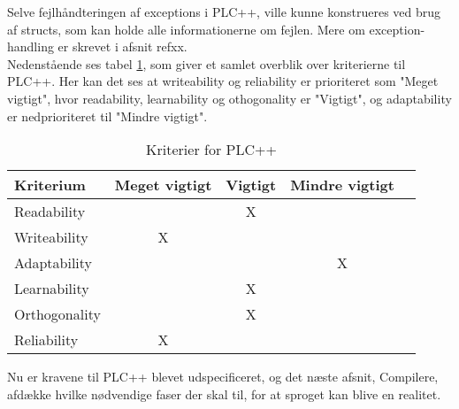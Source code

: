 Selve fejlhåndteringen af exceptions i PLC++, ville kunne konstrueres ved brug af structs, som kan holde alle informationerne om fejlen. Mere om exception-handling er skrevet i afsnit refxx. \\

\noindent Nedenstående ses tabel \ref{table:kriterier}, som giver et samlet overblik over kriterierne til PLC++. Her kan det ses at writeability og reliability er prioriteret som "Meget vigtigt", hvor readability, learnability og othogonality er "Vigtigt", og adaptability er nedprioriteret til "Mindre vigtigt".

\begin{table}[H]
\centering
\begin{tabular}{l c c c c}
\toprule
\textbf{Kriterium} & \textbf{Meget vigtigt} & \textbf{Vigtigt} & \textbf{Mindre vigtigt}  \\ \midrule
Readability        &   & X &       \\ 
Writeability       & X &   &       \\ 
Adaptability       &   &   & X     \\ 
Learnability       &   & X &       \\ 
Orthogonality      &   & X &       \\ 
Reliability        & X &   &       \\ \bottomrule
\end{tabular}
\caption{Kriterier for PLC++}
\label{table:kriterier}
\end{table}

\noindent Nu er kravene til PLC++ blevet udspecificeret, og det næste afsnit, Compilere, afdække hvilke nødvendige faser der skal til, for at sproget kan blive en realitet.






